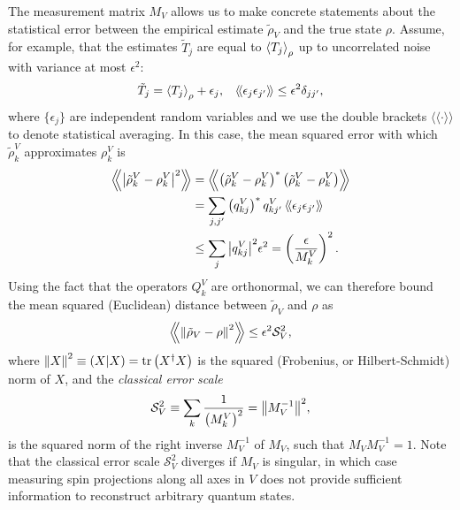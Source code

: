 \documentclass[notitlepage,twocolumn]{revtex4-2}
\newcommand{\f}[2]{\dfrac{#1}{#2}} %
\newcommand{\p}[1]{\left(#1\right)} %
\newcommand{\bk}{\Braket} %
\renewcommand{\set}[1]{\{#1\}} %
\newcommand{\bbk}[1]{\langle\!\langle #1 \rangle\!\rangle}
\newcommand{\Bbk}[1]
{\left\langle\!\!\left\langle #1 \right\rangle\!\!\right\rangle}
\renewcommand{\S}{\mathcal{S}}
\def\obk#1{\mathinner{({#1})}}
\newcommand{\1}{\mathds{1}}
\begin{document}
The measurement matrix $M_V$ allows us to make concrete statements about the statistical error between the empirical estimate $\tilde\rho_V$ and the true state $\rho$.
Assume, for example, that the estimates $\tilde T_j$ are equal to $\bk{T_j}_\rho$ up to uncorrelated noise with variance at most $\epsilon^2$:
\begin{align}
  \tilde T_j = \bk{T_j}_\rho + \epsilon_j,
  &&
  \bbk{\epsilon_j \epsilon_{j'}} \le \epsilon^2 \delta_{jj'},
  \label{eq:error_assumption}
\end{align}
where $\set{\epsilon_j}$ are independent random variables and we use the double brackets $\bbk{\cdot}$ to denote statistical averaging.
In this case, the mean squared error with which $\tilde\rho^V_k$ approximates $\rho^V_k$ is
\begin{align}
  \Bbk{\abs{\tilde\rho^V_k-\rho^V_k}^2}
  &= \Bbk{\p{\tilde\rho^V_k-\rho^V_k}^*\p{\tilde\rho^V_k-\rho^V_k}} \\
  &= \sum_{j,j'} \p{q^V_{kj}}^* q^V_{kj'}\,
  \bbk{\epsilon_j \epsilon_{j'}} \\
  &\le \sum_j \abs{q^V_{kj}}^2 \epsilon^2
  = \p{\f{\epsilon}{M^V_k}}^2.
\end{align}
Using the fact that the operators $Q^V_k$ are orthonormal, we can therefore bound the mean squared (Euclidean) distance between $\tilde\rho_V$ and $\rho$ as
\begin{align}
  \Bbk{\norm{\tilde\rho_V-\rho}^2}
  \le \epsilon^2 \S_V^2,
  \label{eq:bound_eps}
\end{align}
where $\norm{X}^2 \equiv \obk{X|X} = \tr\p{X^\dag X}$ is the squared (Frobenius, or Hilbert-Schmidt) norm of $X$, and the {\it classical error scale}
\begin{align}
  \S_V^2 \equiv \sum_k\f1{\p{M^V_k}^2} = \norm{M_V^{-1}}^2,
\end{align}
is the squared norm of the right inverse $M_V^{-1}$ of $M_V$, such that $M_V M_V^{-1}=1$.
Note that the classical error scale $\S_V^2$ diverges if $M_V$ is singular, in which case measuring spin projections along all axes in $V$ does not provide sufficient information to reconstruct arbitrary quantum states.
\end{document}
